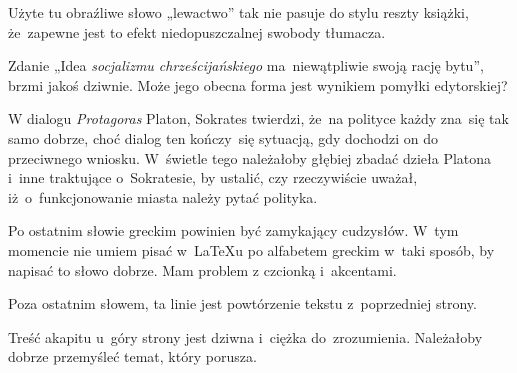 \documentclass[a4paper,11pt]{article}
\begin{document}
\vspace{\spaceFour}





\start {} Użyte tu obraźliwe słowo „lewactwo” tak nie
pasuje do stylu reszty książki, że~zapewne jest to efekt
niedopuszczalnej swobody tłumacza.

\vspace{\spaceFour}





\start {} Zdanie „Idea \textit{socjalizmu
  chrześcijańskiego} ma~niewątpliwie swoją rację bytu”, brzmi jakoś
dziwnie. Może jego obecna forma jest wynikiem pomyłki edytorskiej?

\vspace{\spaceFour}





\start {} W dialogu \textit{Protagoras} Platon, Sokrates
twierdzi, że~na polityce każdy zna~się tak samo dobrze, choć dialog
ten kończy~się sytuacją, gdy dochodzi on do przeciwnego wniosku.
W~świetle tego należałoby głębiej zbadać dzieła Platona i~inne
traktujące o~Sokratesie, by ustalić, czy rzeczywiście uważał,
iż~o~funkcjonowanie miasta należy pytać polityka.

\vspace{\spaceFour}





\start {} Po ostatnim słowie greckim powinien być
zamykający cudzysłów. W~tym momencie nie umiem pisać w~\LaTeX u po
alfabetem greckim w~taki sposób, by napisać to słowo dobrze. Mam
problem z czcionką i~akcentami.

\vspace{\spaceFour}





\start {} Poza ostatnim słowem, ta linie jest powtórzenie
tekstu z~poprzedniej strony.

\vspace{\spaceFour}





\start {} Treść akapitu u~góry strony jest dziwna i~ciężka
do~zrozumienia. Należałoby dobrze przemyśleć temat, który porusza.

\vspace{\spaceFour}
\end{document}
